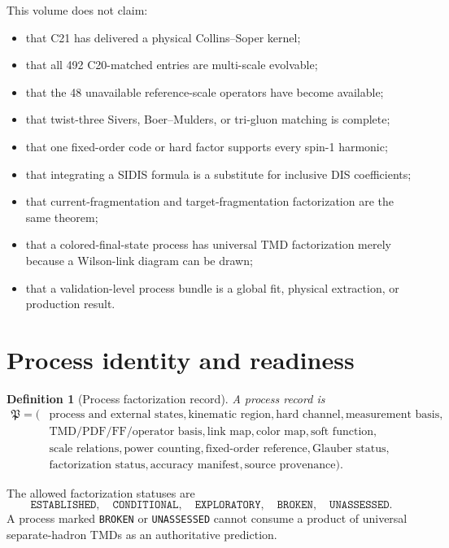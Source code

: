 \documentclass[11pt]{article}
\newtheorem{definition}{Definition}[section]
\begin{document}
This volume does not claim:
\begin{itemize}
\item that C21 has delivered a physical Collins--Soper kernel;
\item that all 492 C20-matched entries are multi-scale evolvable;
\item that the 48 unavailable reference-scale operators have become available;
\item that twist-three Sivers, Boer--Mulders, or tri-gluon matching is complete;
\item that one fixed-order code or hard factor supports every spin-1 harmonic;
\item that integrating a SIDIS formula is a substitute for inclusive DIS coefficients;
\item that current-fragmentation and target-fragmentation factorization are the same theorem;
\item that a colored-final-state process has universal TMD factorization merely because a Wilson-link diagram can be drawn;
\item that a validation-level process bundle is a global fit, physical extraction, or production result.
\end{itemize}

\section{Process identity and readiness}
\label{sec:process-id}

\begin{definition}[Process factorization record]
A process record is
\begin{equation}
\begin{aligned}
 \mathfrak P=\bigl(&
 \text{process and external states},
 \text{kinematic region},
 \text{hard channel},
 \text{measurement basis},\\
 &\text{TMD/PDF/FF/operator basis},
 \text{link map},
 \text{color map},
 \text{soft function},\\
 &\text{scale relations},
 \text{power counting},
 \text{fixed-order reference},
 \text{Glauber status},\\
 &\text{factorization status},
 \text{accuracy manifest},
 \text{source provenance}
 \bigr).
\end{aligned}
\label{eq:process-record}
\end{equation}
\end{definition}

The allowed factorization statuses are
\begin{equation}
 \texttt{ESTABLISHED},\quad
 \texttt{CONDITIONAL},\quad
 \texttt{EXPLORATORY},\quad
 \texttt{BROKEN},\quad
 \texttt{UNASSESSED}.
 \label{eq:factorization-status}
\end{equation}
A process marked \texttt{BROKEN} or \texttt{UNASSESSED} cannot consume a product of universal separate-hadron TMDs as an authoritative prediction.
\end{document}
